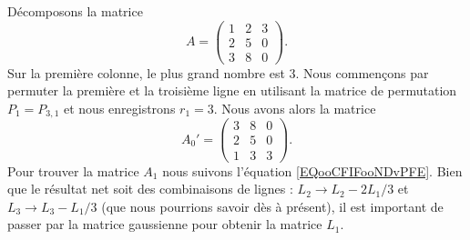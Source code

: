 \begin{example}     \label{EXooAZTDooTUXZJb}
    Décomposons la matrice
    \begin{equation}
        A=\begin{pmatrix}
            1    &   2    &   3    \\
            2    &   5    &   0    \\
            3    &   8    &   0
        \end{pmatrix}.
    \end{equation}
    Sur la première colonne, le plus grand nombre est \( 3\). Nous commençons par permuter la première et la troisième ligne en utilisant la matrice de permutation \( P_1=P_{3,1}\) et nous enregistrons \( r_1=3\). Nous avons alors la matrice
    \begin{equation}        \label{EQooJCCLooOZVajj}
        A_0'=\begin{pmatrix}
            3    &   8    &   0    \\
            2    &   5    &   0    \\
            1    &   3    &   3
        \end{pmatrix}.
    \end{equation}
    Pour trouver la matrice \( A_1\) nous suivons l'équation \eqref{EQooCFIFooNDvPFE}. Bien que le résultat net soit des combinaisons de lignes : \( L_2\to L_2-2L_1/3\) et \( L_3\to L_3-L_1/3\) (que nous pourrions savoir dès à présent), il est important de passer par la matrice gaussienne pour obtenir la matrice \( L_1\).


\end{example}
